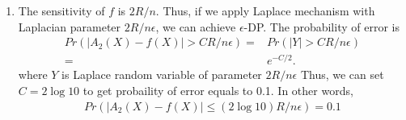 \documentclass[12pt]{article}
\begin{document}
\begin{enumerate}
\begin{solution}
\begin{enumerate}
\item The sensitivity of $f$ is $2R/n$.
Thus, if we apply Laplace mechanism with Laplacian parameter $2R/n\epsilon$, we can achieve $\epsilon$-DP.
The probability of error is
\begin{align*}
    Pr(|A_2(X) - f(X)| > CR/n\epsilon) =& Pr (|Y| > CR/n\epsilon)\\
    =& e^{-C/2}.
\end{align*}
where $Y$ is Laplace random variable of parameter $2R/n\epsilon$
Thus, we can set $C = 2 \log 10$ to get probaility of error equals to 0.1.
In other words,
\begin{align*}
    Pr(|A_2(X) - f(X)| \leq (2\log 10) R/n\epsilon) =0.1
\end{align*}
\end{enumerate}
\end{solution}



\end{enumerate}
\end{document}
